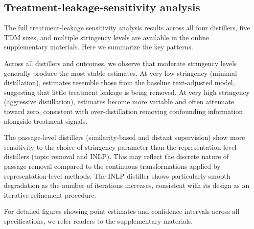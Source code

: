 \documentclass[11pt]{article}
\begin{document}
\subsection{Treatment-leakage-sensitivity analysis}

The full treatment-leakage sensitivity analysis results across all four distillers, five TDM sizes, and multiple stringency levels are available in the online supplementary materials. Here we summarize the key patterns.

Across all distillers and outcomes, we observe that moderate stringency levels generally produce the most stable estimates. At very low stringency (minimal distillation), estimates resemble those from the baseline text-adjusted model, suggesting that little treatment leakage is being removed. At very high stringency (aggressive distillation), estimates become more variable and often attenuate toward zero, consistent with over-distillation removing confounding information alongside treatment signals.

The passage-level distillers (similarity-based and distant supervision) show more sensitivity to the choice of stringency parameter than the representation-level distillers (topic removal and INLP). This may reflect the discrete nature of passage removal compared to the continuous transformations applied by representation-level methods. The INLP distiller shows particularly smooth degradation as the number of iterations increases, consistent with its design as an iterative refinement procedure.

For detailed figures showing point estimates and confidence intervals across all specifications, we refer readers to the supplementary materials.
\end{document}
